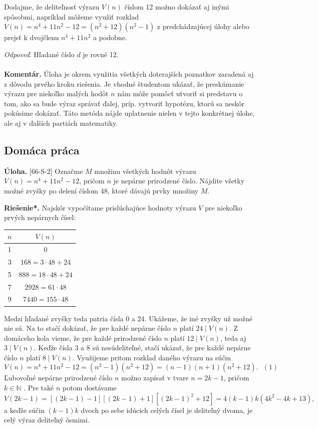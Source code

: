 \documentclass[11pt,a4paper,oneside,final]{book}
\newcommand{\NN}{\mathbb{N}}
\newcommand{\kom}{\textbf{Komentár.} }
\newcommand{\ul}{\textbf{Úloha.} }
\newcommand{\rieh}{\textbf{Riešenie*.} }
\begin{document}
Dodajme, že deliteľnosť výrazu $V (n)$ číslom 12 možno dokázať aj inými spôsobmi, napríklad môžeme využiť rozklad $V (n) = n^4+ 11n^2 - 12 = (n^2+ 12)(n^2 - 1)$ z predchádzajúcej úlohy alebo prejsť k dvojčlenu $n^4 + 11n^2$ a podobne.

\textit{Odpoveď}. Hľadané číslo $d$ je rovné 12.\\
\\
\kom Úloha je okrem využitia všetkých doterajších poznatkov zaradená aj z dôvodu prvého kroku riešenia. Je vhodné študentom ukázať, že preskúmanie výrazu pre niekoľko malých hodôt $n$ nám môže pomôcť utvoriť si predstavu o tom, ako sa bude výraz správať ďalej, príp. vytvoriť hypotézu, ktorú sa neskôr pokúsime dokázať. Táto metóda nájde uplatnenie nielen v tejto konkrétnej úlohe, ale aj v ďalších partiách matematiky.\\

\subsection*{Domáca práca}
\begin{tcolorbox}[breakable,notitle,boxrule=0pt,colback=light-gray,colframe=light-gray]\ul [66-S-2]
Označme $M$ množinu všetkých hodnôt výrazu $V (n) = n^4 + 11n^2 - 12$, pričom $n$ je nepárne prirodzené číslo. Nájdite všetky možné zvyšky po delení číslom 48, ktoré dávajú prvky množiny $M$.

\end{tcolorbox}

\rieh Najskôr vypočítame prislúchajúce hodnoty výrazu $V$ pre niekoľko prvých nepárnych čísel:
\begin{center}
\begin{tabular}{c c}
$n$ & $V (n)$\\
\hline
1 & 0\\
3 & $168 = 3 \cdot 48 + 24$ \\
5 & $888 = 18 \cdot 48 + 24$ \\
7 & $2928 = 61 \cdot 48$\\
9 & $7440 = 155 \cdot 48$
\end{tabular}
\end{center}

Medzi hľadané zvyšky teda patria čísla 0 a 24. Ukážeme, že iné zvyšky už možné nie sú. Na to stačí dokázať, že pre každé nepárne číslo $n$ platí $24 \mid V (n)$. Z domáceho kola vieme, že pre každé prirodzené číslo $n$ platí $12 \mid V (n)$, teda aj $3 \mid V (n)$. Keďže čísla 3 a 8 sú nesúdeliteľné, stačí ukázať, že pre každé nepárne číslo $n$ platí $8 \mid V (n)$. Využijeme
pritom rozklad daného výrazu na súčin
$$V (n) = n^4+ 11n^2 - 12 = (n^2 - 1)(n^2+ 12) = (n - 1)(n + 1)(n^2+ 12). \ \ \ (1)$$
Ľubovoľné nepárne prirodzené číslo $n$ možno zapísať v tvare $n = 2k - 1$, pričom $k \in \NN$ . Pre také $n$ potom dostávame
$$V (2k - 1) = [(2k - 1) - 1][(2k - 1) + 1][(2k - 1)^2
+ 12] = 4(k - 1)k(4k^2 - 4k + 13),$$
a keďže súčin $(k - 1)k$ dvoch po sebe idúcich celých čísel je deliteľný dvoma, je celý výraz deliteľný ôsmimi.
\end{document}
